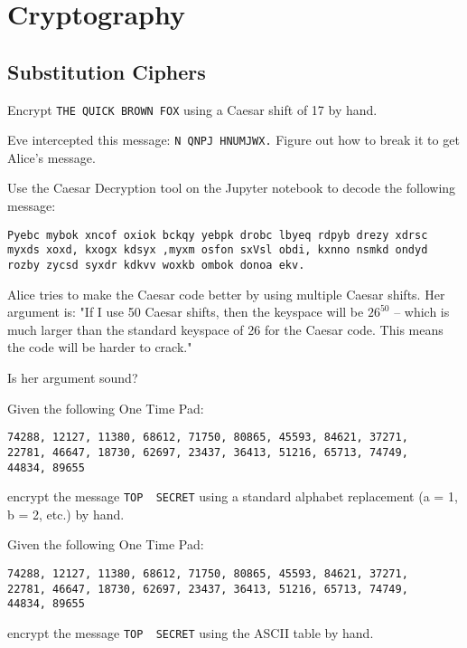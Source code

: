 \documentclass[11pt,a4paper]{report}
\begin{document}
\section{Cryptography}

\subsection{Substitution Ciphers}

\begin{ex}
Encrypt \verb|THE QUICK BROWN FOX| using a Caesar shift of 17 by hand.
\end{ex}


\begin{ex}
Eve intercepted this message: \verb|N QNPJ HNUMJWX.| Figure out how to break it to get Alice’s message.
\end{ex}


\begin{ex}
Use the Caesar Decryption tool on the Jupyter notebook to decode the following message:
\begin{verbatim}
Pyebc mybok xncof oxiok bckqy yebpk drobc lbyeq rdpyb drezy xdrsc
myxds xoxd, kxogx kdsyx ,myxm osfon sxVsl obdi, kxnno nsmkd ondyd
rozby zycsd syxdr kdkvv woxkb ombok donoa ekv.
\end{verbatim}
\end{ex}

\begin{ex}
Alice tries to make the Caesar code better by using multiple Caesar shifts. Her argument is: "If I use 50 Caesar shifts,  then the keyspace will be $26^50$ -- which is much larger than the standard keyspace of 26 for the Caesar code.  This means the code will be harder to crack." 

Is her argument sound?
\end{ex}

\begin{ex}
Given the following One Time Pad: 
\begin{verbatim}
74288, 12127, 11380, 68612, 71750, 80865, 45593, 84621, 37271,
22781, 46647, 18730, 62697, 23437, 36413, 51216, 65713, 74749,
44834, 89655
\end{verbatim}
encrypt the message \verb|TOP  SECRET| using a standard alphabet replacement (a = 1, b = 2, etc.) by hand.
\end{ex}

\begin{ex}
Given the following One Time Pad: 
\begin{verbatim}
74288, 12127, 11380, 68612, 71750, 80865, 45593, 84621, 37271,
22781, 46647, 18730, 62697, 23437, 36413, 51216, 65713, 74749,
44834, 89655
\end{verbatim}
encrypt the message \verb|TOP  SECRET| using the ASCII table by hand.
\end{ex}
\end{document}
